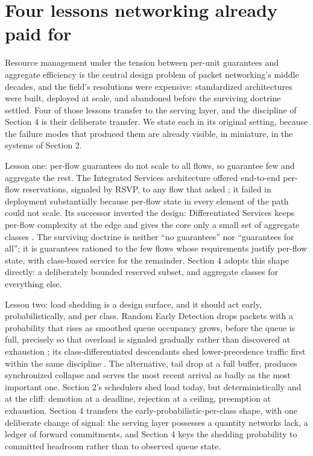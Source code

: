 \section{Four lessons networking already paid for}

Resource management under the tension between per-unit guarantees and
aggregate efficiency is the central design problem of packet networking's
middle decades, and the field's resolutions were expensive: standardized
architectures were built, deployed at scale, and abandoned before the
surviving doctrine settled. Four of those lessons transfer to the serving
layer, and the discipline of Section 4 is their deliberate transfer. We
state each in its original setting, because the failure modes that
produced them are already visible, in miniature, in the systems of
Section 2.

Lesson one: per-flow guarantees do not scale to all flows, so guarantee
few and aggregate the rest. The Integrated Services architecture offered
end-to-end per-flow reservations, signaled by RSVP, to any flow that
asked \citep{rfc2205}; it failed in deployment substantially because per-flow
state in every element of the path could not scale. Its successor
inverted the design: Differentiated Services keeps per-flow complexity at
the edge and gives the core only a small set of aggregate classes
\citep{rfc2475}. The surviving doctrine is neither ``no guarantees'' nor
``guarantees for all''; it is guarantees rationed to the few flows whose
requirements justify per-flow state, with class-based service for the
remainder. Section 4 adopts this shape directly: a deliberately bounded
reserved subset, and aggregate classes for everything else.

Lesson two: load shedding is a design surface, and it should act early,
probabilistically, and per class. Random Early Detection drops packets
with a probability that rises as smoothed queue occupancy grows, before
the queue is full, precisely so that overload is signaled gradually
rather than discovered at exhaustion \citep{floyd1993red}; its
class-differentiated descendants shed lower-precedence traffic first
within the same discipline \citep{rfc2597}. The alternative, tail drop at a
full buffer, produces synchronized collapse and serves the most recent
arrival as badly as the most important one. Section 2's schedulers shed
load today, but deterministically and at the cliff: demotion at a
deadline, rejection at a ceiling, preemption at exhaustion. Section 4
transfers the early-probabilistic-per-class shape, with one deliberate
change of signal: the serving layer possesses a quantity networks lack, a
ledger of forward commitments, and Section 4 keys the shedding
probability to committed headroom rather than to observed queue state.

